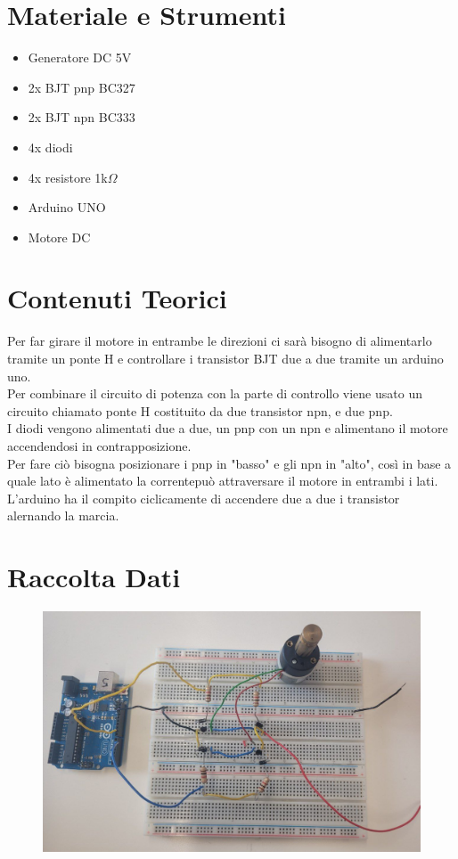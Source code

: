 \documentclass[12pt]{article}
\begin{document}
\section{Materiale e Strumenti}
	\begin{itemize}
		\item Generatore DC 5V
		\item 2x BJT pnp BC327
		\item 2x BJT npn BC333
		\item 4x diodi 
		\item 4x resistore 1k$\Omega$
		\item Arduino UNO
		\item Motore DC
	\end{itemize}

\section{Contenuti Teorici}
Per far girare il motore in entrambe le direzioni ci sarà bisogno di alimentarlo tramite un ponte H e controllare
i transistor BJT due a due tramite un arduino uno.\\
Per combinare il circuito di potenza con la parte di controllo viene usato un circuito chiamato ponte H
costituito da due transistor npn, e due pnp.\\
I diodi vengono alimentati due a due, un pnp con un npn e alimentano il motore accendendosi in contrapposizione.\\
Per fare ciò bisogna posizionare i pnp in "basso" e gli npn in "alto", così in base a quale lato è alimentato  
la correntepuò attraversare il motore in entrambi i lati.\\
L'arduino ha il compito ciclicamente di accendere due a due i transistor alernando la marcia.\\

\section{Raccolta Dati}
\begin{figure}[H]
   
    \includegraphics[scale=0.3]{montaggio.jpg}
\end{figure}
\end{document}
